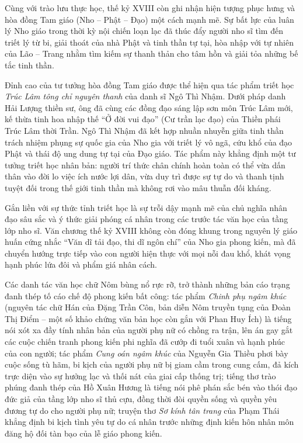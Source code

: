 Cùng với trào lưu thực học, thế kỷ XVIII còn ghi nhận hiện tượng phục hưng và hòa đồng Tam giáo (Nho -- Phật -- Đạo) một cách mạnh mẽ. Sự bất lực của luân lý Nho giáo trong thời kỳ nội chiến loạn lạc đã thúc đẩy người nho sĩ tìm đến triết lý từ bi, giải thoát của nhà Phật và tinh thần tự tại, hòa nhập với tự nhiên của Lão -- Trang nhằm tìm kiếm sự thanh thản cho tâm hồn và giải tỏa những bế tắc tinh thần.

Đỉnh cao của tư tưởng hòa đồng Tam giáo được thể hiện qua tác phẩm triết học \textit{Trúc Lâm tông chỉ nguyên thanh} của danh sĩ Ngô Thì Nhậm. Dưới pháp danh Hải Lượng thiền sư, ông đã cùng các đồng đạo sáng lập sơn môn Trúc Lâm mới, kế thừa tinh hoa nhập thế ``Ở đời vui đạo'' (Cư trần lạc đạo) của Thiền phái Trúc Lâm thời Trần. Ngô Thì Nhậm đã kết hợp nhuần nhuyễn giữa tinh thần trách nhiệm phụng sự quốc gia của Nho gia với triết lý vô ngã, cứu khổ của đạo Phật và thái độ ung dung tự tại của Đạo giáo. Tác phẩm này khẳng định một tư tưởng triết học nhân bản: người trí thức chân chính hoàn toàn có thể vừa dấn thân vào đời lo việc ích nước lợi dân, vừa duy trì được sự tự do và thanh tịnh tuyệt đối trong thế giới tinh thần mà không rơi vào mâu thuẫn đối kháng.

Gắn liền với sự thức tỉnh triết học là sự trỗi dậy mạnh mẽ của chủ nghĩa nhân đạo sâu sắc và ý thức giải phóng cá nhân trong các trước tác văn học của tầng lớp nho sĩ. Văn chương thế kỷ XVIII không còn đóng khung trong nguyên lý giáo huấn cứng nhắc ``Văn dĩ tải đạo, thi dĩ ngôn chí'' của Nho gia phong kiến, mà đã chuyển hướng trực tiếp vào con người hiện thực với mọi nỗi đau khổ, khát vọng hạnh phúc lứa đôi và phẩm giá nhân cách.

Các danh tác văn học chữ Nôm bùng nổ rực rỡ, trở thành những bản cáo trạng đanh thép tố cáo chế độ phong kiến bất công: tác phẩm \textit{Chinh phụ ngâm khúc} (nguyên tác chữ Hán của Đặng Trần Côn, bản diễn Nôm truyền tụng của Đoàn Thị Điểm -- một số khảo chứng văn bản học còn gắn với Phan Huy Ích) là tiếng nói xót xa đầy tính nhân bản của người phụ nữ có chồng ra trận, lên án gay gắt các cuộc chiến tranh phong kiến phi nghĩa đã cướp đi tuổi xuân và hạnh phúc của con người; tác phẩm \textit{Cung oán ngâm khúc} của Nguyễn Gia Thiều phơi bày cuộc sống tù hãm, bi kịch của người phụ nữ bị giam cầm trong cung cấm, đả kích trực diện vào sự hưởng lạc và thối nát của giai cấp thống trị; tiếng thơ trào phúng đanh thép của Hồ Xuân Hương là tiếng nói phê phán sắc bén vào thói đạo đức giả của tầng lớp nho sĩ thủ cựu, đồng thời đòi quyền sống và quyền yêu đương tự do cho người phụ nữ; truyện thơ \textit{Sơ kính tân trang} của Phạm Thái khẳng định bi kịch tình yêu tự do cá nhân trước những định kiến hôn nhân môn đăng hộ đối tàn bạo của lễ giáo phong kiến.

